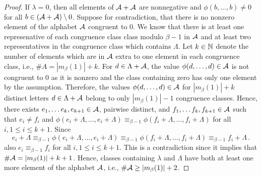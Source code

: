 \begin{proof}

If $\lambda=0$, then all elements of $\mathcal{A}+\mathcal{A}$ are nonnegative and $\phi(b,\dots,b)\neq 0$ for all $b\in(\mathcal{A}+\mathcal{A})\setminus 0$. Suppose for contradiction, that there is no nonzero element of the alphabet $\mathcal{A}$ congruent to 0. We know that there is at least one represenative of each congruence class class modulo $\beta-1$ in $\mathcal{A}$ and at least two representatives in the congruence class which contains $\Lambda$. Let $k\in\mathbb{N}$ denote the number of elements which are in $\mathcal{A}$ extra to one element in each congruence class, i.e., $\#A=|m_\beta(1)|+k$.  For $d\in\Lambda+\mathcal{A}$, the value $\phi(d,\dots,d)\in\mathcal{A}$ is not congruent to 0 as it is nonzero and the class containing zero has only one element by the assumption. Therefore, the values  $\phi(d,\dots,d)\in\mathcal{A}$ for $|m_\beta(1)|+k$ distinct letters $d\in\Lambda+\mathcal{A}$ belong to only $|m_\beta(1)|-1$ congruence classes. Hence, there exists $e_1,\dots e_k, e_{k+1}\in\mathcal{A}$, pairwise distinct, and $f_1,\dots f_k, f_{k+1}\in\mathcal{A}$ such that $e_i\neq f_i$ and $\phi(e_i+\Lambda,\dots, e_i+\Lambda)\equiv_{\beta-1}\phi(f_i+\Lambda,\dots, f_i+\Lambda)$ for all $i, 1\leq i\leq k+1$. Since 
$$
e_i+\Lambda\equiv_{\beta-1}\phi(e_i+\Lambda,\dots, e_i+\Lambda)\equiv_{\beta-1}\phi(f_i+\Lambda,\dots, f_i+\Lambda)\equiv_{\beta-1}f_i+\Lambda\,.
$$ 
also $e_i\equiv_{\beta-1}f_i$ for all $i, 1\leq i\leq k+1$. This is a contradiction since it implies that $\#\mathcal{A}=|m_\beta(1)|+k+1$. Hence, classes containing $\lambda$ and $\Lambda$ have both at least one more  element of the alphabet $\mathcal{A}$, i.e., $\#\mathcal{A}\geq |m_\beta(1)|+2$. 
\end{proof}
